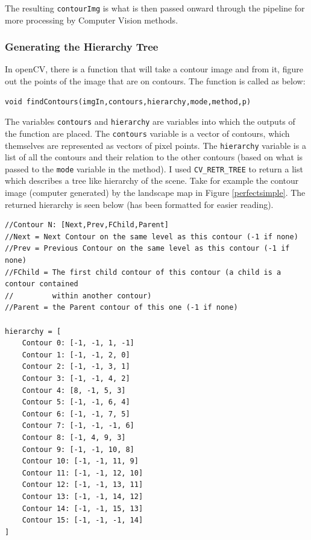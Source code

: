 \documentclass[11pt]{article}
\begin{document}
The resulting \texttt{contourImg} is what is then passed onward 
through the pipeline for more processing by Computer Vision methods.

\subsubsection{Generating the Hierarchy Tree}
\label{sec:hierarchytree}
In openCV, there is a function that will take a contour image and from
it, figure out the points of the image that are on contours. The function is
called as below:
\begin{lstlisting}
void findContours(imgIn,contours,hierarchy,mode,method,p)
\end{lstlisting}

The variables \texttt{contours} and \texttt{hierarchy} are variables into which
the outputs of the function are placed. The \texttt{contours} variable is a vector
of contours, which themselves are represented as vectors of pixel points. 
The \texttt{hierarchy} variable is a list of all the contours and their
relation to the other contours (based on what is passed to the \texttt{mode}
variable in the method). I used \texttt{CV\_RETR\_TREE} to return a list which
describes a tree like hierarchy of the scene. Take for example the contour
image (computer generated) by the landscape map in Figure \ref{perfectsimple}.
The returned hierarchy is seen below (has been formatted for easier reading).
\begin{lstlisting}
//Contour N: [Next,Prev,FChild,Parent]
//Next = Next Contour on the same level as this contour (-1 if none)
//Prev = Previous Contour on the same level as this contour (-1 if none)
//FChild = The first child contour of this contour (a child is a contour contained
//		   within another contour)
//Parent = the Parent contour of this one (-1 if none)

hierarchy = [
	Contour 0: [-1, -1, 1, -1]
	Contour 1: [-1, -1, 2, 0]
	Contour 2: [-1, -1, 3, 1]
	Contour 3: [-1, -1, 4, 2]
	Contour 4: [8, -1, 5, 3]
	Contour 5: [-1, -1, 6, 4]
	Contour 6: [-1, -1, 7, 5]
	Contour 7: [-1, -1, -1, 6]
	Contour 8: [-1, 4, 9, 3]
	Contour 9: [-1, -1, 10, 8]
	Contour 10: [-1, -1, 11, 9]
	Contour 11: [-1, -1, 12, 10]
	Contour 12: [-1, -1, 13, 11]
	Contour 13: [-1, -1, 14, 12]
	Contour 14: [-1, -1, 15, 13]
	Contour 15: [-1, -1, -1, 14]
]
\end{lstlisting}
\end{document}
